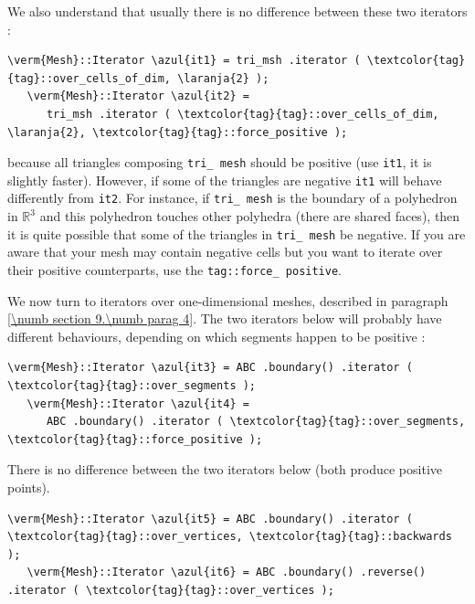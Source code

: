 We also understand that usually there is no difference between these two iterators :

\begin{Verbatim}[commandchars=\\\{\},formatcom=\small\tt,
   baselinestretch=0.94,framesep=2mm                      ]
   \verm{Mesh}::Iterator \azul{it1} = tri_msh .iterator ( \textcolor{tag}{tag}::over_cells_of_dim, \laranja{2} );
   \verm{Mesh}::Iterator \azul{it2} =
      tri_msh .iterator ( \textcolor{tag}{tag}::over_cells_of_dim, \laranja{2}, \textcolor{tag}{tag}::force_positive );
\end{Verbatim}

\noindent because all triangles composing {\small\tt tri\_\,mesh} should be positive
(use {\small\tt it1}, it is slightly faster).
However, if some of the triangles are negative {\small\tt it1} will behave differently from
{\small\tt it2}.
For instance, if {\small\tt tri\_\,mesh} is the boundary of a polyhedron in $ \mathbb{R}^3 $
and this polyhedron touches other polyhedra (there are shared faces), then it is
quite possible that some of the triangles in {\small\tt tri\_\,mesh} be negative.
If you are aware that your mesh may contain negative cells but
you want to iterate over their positive counterparts, use the {\small\tt \textcolor{tag}{tag}::force\_\,positive}.

We now turn to iterators over one-dimensional meshes, described in paragraph
\ref{\numb section 9.\numb parag 4}.
The two iterators below will probably have different behaviours,
depending on which segments happen to be positive :

\begin{Verbatim}[commandchars=\\\{\},formatcom=\small\tt,
   baselinestretch=0.94,framesep=2mm                      ]
   \verm{Mesh}::Iterator \azul{it3} = ABC .boundary() .iterator ( \textcolor{tag}{tag}::over_segments );
   \verm{Mesh}::Iterator \azul{it4} =
      ABC .boundary() .iterator ( \textcolor{tag}{tag}::over_segments, \textcolor{tag}{tag}::force_positive );
\end{Verbatim}

There is no difference between the two iterators below (both produce positive
points).

\begin{Verbatim}[commandchars=\\\{\},formatcom=\small\tt,
   baselinestretch=0.94,framesep=2mm                      ]
   \verm{Mesh}::Iterator \azul{it5} = ABC .boundary() .iterator ( \textcolor{tag}{tag}::over_vertices, \textcolor{tag}{tag}::backwards );
   \verm{Mesh}::Iterator \azul{it6} = ABC .boundary() .reverse() .iterator ( \textcolor{tag}{tag}::over_vertices );
\end{Verbatim}

